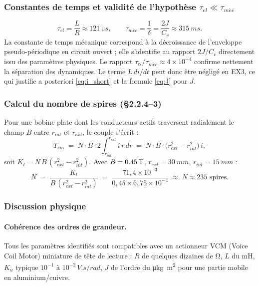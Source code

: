 \subsubsection{Constantes de temps et validité de l'hypothèse \texorpdfstring{\(\tau_{el} \ll \tau_{m\acute{e}c}\)}{tau\_el << tau\_mec}}

\[
\tau_{el} = \frac{L}{R} \approx \SI{121}{\micro s}, \qquad
\tau_{m\acute{e}c} = \frac{1}{\delta} = \frac{2J}{C_v} \approx \SI{315}{ms}.
\]
La constante de temps mécanique correspond à la décroissance de l'enveloppe pseudo-périodique en circuit ouvert ; elle s'identifie au rapport \(2J/C_v\) directement issu des paramètres physiques. Le rapport \(\tau_{el}/\tau_{m\acute{e}c} \approx 4\!\times\!10^{-4}\) confirme nettement la séparation des dynamiques. Le terme \(L\,di/dt\) peut donc être négligé en EX3, ce qui justifie a posteriori \eqref{eq:i_short} et la formule \eqref{eq:J} pour \(J\).

\subsubsection{Calcul du nombre de spires (§2.2.4--3)}

Pour une bobine plate dont les conducteurs actifs traversent radialement le champ \(B\) entre \(r_{int}\) et \(r_{ext}\), le couple s'écrit :
\[
T_{em} \;=\; N \cdot B \cdot 2 \int_{r_{int}}^{r_{ext}} i\,r\,dr
\;=\; N \cdot B \cdot \bigl(r_{ext}^2 - r_{int}^2\bigr)\,i,
\]
soit \(K_t = N\,B\,(r_{ext}^2 - r_{int}^2)\). Avec \(B = \SI{0{,}45}{T}\), \(r_{ext} = \SI{30}{mm}\), \(r_{int} = \SI{15}{mm}\) :
\[
N \;=\; \frac{K_t}{B\,(r_{ext}^2 - r_{int}^2)}
\;=\; \frac{71{,}4\!\times\!10^{-3}}{0{,}45 \times 6{,}75\!\times\!10^{-4}}
\;\approx\; \boxed{N \approx 235 \text{ spires}}.
\]


\subsubsection{Discussion physique}

\paragraph{Cohérence des ordres de grandeur.} Tous les paramètres identifiés sont compatibles avec un actionneur VCM (Voice Coil Motor) miniature de tête de lecture : \(R\) de quelques dizaines de \si{\ohm}, \(L\) du \si{mH}, \(K_u\) typique \(10^{-1}\) à \(10^{-2}\,\si{V.s/rad}\), \(J\) de l'ordre du \si{\micro kg.m^2} pour une partie mobile en aluminium/cuivre.

